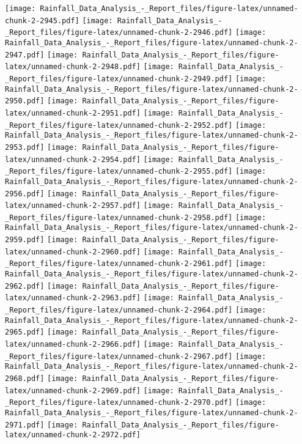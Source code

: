 \documentclass[
]{article}
\begin{document}
\texttt{[image: Rainfall\_Data\_Analysis\_-\_Report\_files/figure-latex/unnamed-chunk-2-2945.pdf]}
\texttt{[image: Rainfall\_Data\_Analysis\_-\_Report\_files/figure-latex/unnamed-chunk-2-2946.pdf]}
\texttt{[image: Rainfall\_Data\_Analysis\_-\_Report\_files/figure-latex/unnamed-chunk-2-2947.pdf]}
\texttt{[image: Rainfall\_Data\_Analysis\_-\_Report\_files/figure-latex/unnamed-chunk-2-2948.pdf]}
\texttt{[image: Rainfall\_Data\_Analysis\_-\_Report\_files/figure-latex/unnamed-chunk-2-2949.pdf]}
\texttt{[image: Rainfall\_Data\_Analysis\_-\_Report\_files/figure-latex/unnamed-chunk-2-2950.pdf]}
\texttt{[image: Rainfall\_Data\_Analysis\_-\_Report\_files/figure-latex/unnamed-chunk-2-2951.pdf]}
\texttt{[image: Rainfall\_Data\_Analysis\_-\_Report\_files/figure-latex/unnamed-chunk-2-2952.pdf]}
\texttt{[image: Rainfall\_Data\_Analysis\_-\_Report\_files/figure-latex/unnamed-chunk-2-2953.pdf]}
\texttt{[image: Rainfall\_Data\_Analysis\_-\_Report\_files/figure-latex/unnamed-chunk-2-2954.pdf]}
\texttt{[image: Rainfall\_Data\_Analysis\_-\_Report\_files/figure-latex/unnamed-chunk-2-2955.pdf]}
\texttt{[image: Rainfall\_Data\_Analysis\_-\_Report\_files/figure-latex/unnamed-chunk-2-2956.pdf]}
\texttt{[image: Rainfall\_Data\_Analysis\_-\_Report\_files/figure-latex/unnamed-chunk-2-2957.pdf]}
\texttt{[image: Rainfall\_Data\_Analysis\_-\_Report\_files/figure-latex/unnamed-chunk-2-2958.pdf]}
\texttt{[image: Rainfall\_Data\_Analysis\_-\_Report\_files/figure-latex/unnamed-chunk-2-2959.pdf]}
\texttt{[image: Rainfall\_Data\_Analysis\_-\_Report\_files/figure-latex/unnamed-chunk-2-2960.pdf]}
\texttt{[image: Rainfall\_Data\_Analysis\_-\_Report\_files/figure-latex/unnamed-chunk-2-2961.pdf]}
\texttt{[image: Rainfall\_Data\_Analysis\_-\_Report\_files/figure-latex/unnamed-chunk-2-2962.pdf]}
\texttt{[image: Rainfall\_Data\_Analysis\_-\_Report\_files/figure-latex/unnamed-chunk-2-2963.pdf]}
\texttt{[image: Rainfall\_Data\_Analysis\_-\_Report\_files/figure-latex/unnamed-chunk-2-2964.pdf]}
\texttt{[image: Rainfall\_Data\_Analysis\_-\_Report\_files/figure-latex/unnamed-chunk-2-2965.pdf]}
\texttt{[image: Rainfall\_Data\_Analysis\_-\_Report\_files/figure-latex/unnamed-chunk-2-2966.pdf]}
\texttt{[image: Rainfall\_Data\_Analysis\_-\_Report\_files/figure-latex/unnamed-chunk-2-2967.pdf]}
\texttt{[image: Rainfall\_Data\_Analysis\_-\_Report\_files/figure-latex/unnamed-chunk-2-2968.pdf]}
\texttt{[image: Rainfall\_Data\_Analysis\_-\_Report\_files/figure-latex/unnamed-chunk-2-2969.pdf]}
\texttt{[image: Rainfall\_Data\_Analysis\_-\_Report\_files/figure-latex/unnamed-chunk-2-2970.pdf]}
\texttt{[image: Rainfall\_Data\_Analysis\_-\_Report\_files/figure-latex/unnamed-chunk-2-2971.pdf]}
\texttt{[image: Rainfall\_Data\_Analysis\_-\_Report\_files/figure-latex/unnamed-chunk-2-2972.pdf]}
\end{document}
